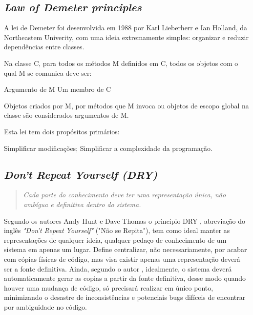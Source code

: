 \documentclass[12pt]{article}
\begin{document}
\subsection{\textit{Law of Demeter principles}} \label{sec:law_of_demeter}

A lei de Demeter foi desenvolvida em 1988 por Karl Lieberherr e Ian Holland, da Northeastem Univerity, com uma ideia extremamente simples: organizar e reduzir dependências entre classes.

Na classe C, para todos os métodos M definidos em C, todos os objetos com o qual M se comunica deve ser:

    Argumento de M
    Um membro de C

Objetos criados por M, por métodos que M invoca ou objetos de escopo global na classe são considerados argumentos de M.

Esta lei tem dois propósitos primários:

    Simplificar modificações;
    Simplificar a complexidade da programação.


\subsection{\textit{Don't Repeat Yourself (DRY)}} \label{sec:dey}

\begin{quote}
\textit{Cada parte do conhecimento deve ter uma representação única, não ambígua e definitiva dentro do sistema.}
\end{quote}

Segundo os autores Andy Hunt e Dave Thomas \cite{KEEP_IT_DRY_SHY} o principio DRY \cite{THE_PRAGMATIC_PROGRAMMER}, abreviação do inglês \textit{"Don't Repeat Yourself"} ("Não se Repita"), tem como ideal manter as representações de qualquer ideia, qualquer pedaço de conhecimento de um sistema em apenas um lugar.
Define centralizar, não necessariamente, por acabar com cópias físicas de código, mas visa existir apenas uma representação deverá ser a fonte definitiva.
Ainda, segundo o autor \cite{KEEP_IT_DRY_SHY}, idealmente, o sistema deverá automaticamente gerar as copias a partir da fonte definitiva, desse modo quando houver uma mudança de código, só precisará realizar em único ponto, minimizando o desastre de inconsistências e potenciais bugs difíceis de encontrar por ambiguidade no código. 
\end{document}
